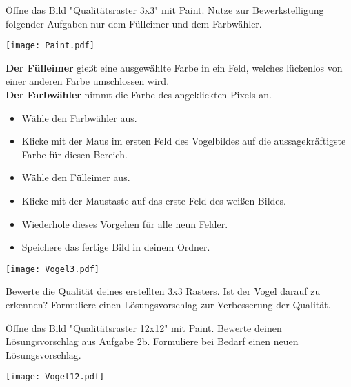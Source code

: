 \documentclass[a4paper, 12pt]{article}
\begin{document}
\large
\TITEL

\aufgabe{}
Öffne das Bild "Qualitätsraster 3x3" mit Paint.
	Nutze zur Bewerkstelligung folgender Aufgaben nur dem Fülleimer und dem Farbwähler.\\

	\begin{minipage}{0.6\textwidth}\vspace{0pt}
		\texttt{[image: Paint.pdf]}
	\end{minipage}
	\hfill
	\begin{minipage}{0.39\textwidth}\vspace{0pt}
			\textbf{Der Fülleimer} gießt eine ausgewählte Farbe in ein Feld, welches lückenlos von einer anderen Farbe umschlossen wird.\\
			
			\textbf{Der Farbwähler} nimmt die Farbe des angeklickten Pixels an.
	\end{minipage}
	\begin{minipage}{0.6\textwidth}
	\vspace{0.2cm}
		\begin{itemize}\setlength\itemsep{0pt}
			\item Wähle den Farbwähler aus.
			\item Klicke mit der Maus im ersten Feld des Vogelbildes auf die aussagekräftigste Farbe für diesen Bereich.
			\item Wähle den Fülleimer aus.
			\item Klicke mit der Maustaste auf das erste Feld des weißen Bildes.
			\item Wiederhole dieses Vorgehen für alle neun Felder.
			\item Speichere das fertige Bild in deinem Ordner.
		\end{itemize}
	\end{minipage}
	\begin{minipage}{0.4\textwidth}
		\texttt{[image: Vogel3.pdf]}
	\end{minipage}

\aufgabe{}
\begin{tasks}
	\task Bewerte die Qualität deines erstellten 3x3 Rasters. Ist der Vogel darauf zu erkennen?
	\task Formuliere einen Lösungsvorschlag zur Verbesserung der Qualität.
\end{tasks}

\aufgabe{}
\begin{minipage}{0.6\textwidth}
		Öffne das Bild "Qualitätsraster 12x12" mit Paint. Bewerte deinen Lösungsvorschlag aus Aufgabe 2b. Formuliere bei Bedarf einen neuen Lösungsvorschlag.\\
	\end{minipage}
	\begin{minipage}{0.4\textwidth}
		\texttt{[image: Vogel12.pdf]}
	\end{minipage}
	\vspace{0.2cm}
\end{document}

